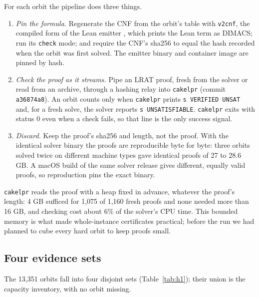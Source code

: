 \documentclass{anvil-paper}
\newcommand{\repobase}{https://github.com/rjwalters/lean-genius/blob/fa2b41268df024128ed4738b3bb500637cf1ec12}
\newcommand{\repofile}[2]{\href{\repobase/#1}{\lean{#2}}}
\newcommand{\cakelpr}{\texttt{cake\textunderscore lpr}}
\newcommand{\vtwocnf}{\texttt{v2cnf}}
\theoremstyle{definition}
\begin{document}
For each orbit the pipeline does three things.
\begin{enumerate}
\item \emph{Pin the formula.} Regenerate the CNF from the orbit's table with \vtwocnf, the compiled form of the Lean emitter \repofile{proofs/Proofs/Erdos85OneHighV2CnfEmit.lean}{Erdos85OneHighV2CnfEmit.lean}, which prints the Lean term  as DIMACS; run its \texttt{check} mode; and require the CNF's sha256 to equal the hash recorded when the orbit was first solved. The emitter binary and container image are pinned by hash.
\item \emph{Check the proof as it streams.} Pipe an LRAT proof, fresh from the solver or read from an archive, through a hashing relay into \cakelpr{} (commit \texttt{a36874a8}). An orbit counts only when \cakelpr{} prints \texttt{s VERIFIED UNSAT} and, for a fresh solve, the solver reports \texttt{s UNSATISFIABLE}. \cakelpr{} exits with status 0 even when a check fails, so that line is the only success signal.
\item \emph{Discard.} Keep the proof's sha256 and length, not the proof. With the identical solver binary the proofs are reproducible byte for byte: three orbits solved twice on different machine types gave identical proofs of 27 to 28.6 GB. A macOS build of the same solver release gives different, equally valid proofs, so reproduction pins the exact binary.
\end{enumerate}
\cakelpr{} reads the proof with a heap fixed in advance, whatever the proof's length: 4 GB sufficed for 1,075 of 1,160 fresh proofs and none needed more than 16 GB, and checking cost about 6\% of the solver's CPU time. This bounded memory is what made whole-instance certificates practical; before the run we had planned to cube every hard orbit to keep proofs small.

\subsection{Four evidence sets}\label{sec:sets}

The 13,351 orbits fall into four disjoint sets (Table~\ref{tab:h1}); their union is the capacity inventory, with no orbit missing.
\end{document}
